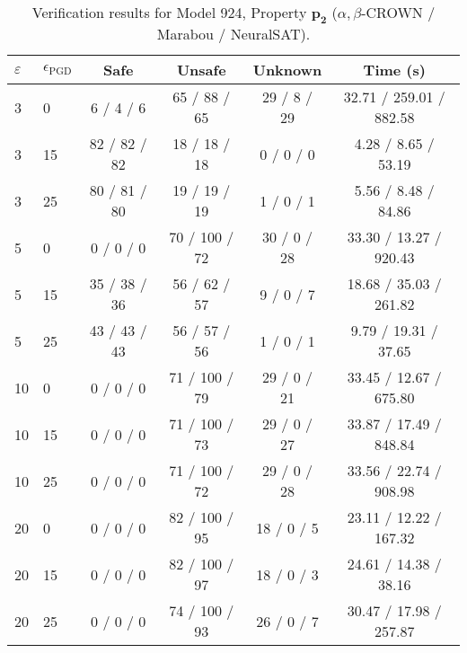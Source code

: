 \begin{table}[htbp]\centering
\caption{\small Verification results for Model 924, Property $\mathbf{p_{2}}$ ($\alpha,\beta$-CROWN / Marabou / NeuralSAT).}
\label{tab:model924_p2}
\begin{tabular}{llcccc}
\toprule
$\varepsilon$ & $\epsilon_{\scriptscriptstyle\mathrm{PGD}}$ & Safe & Unsafe & Unknown & Time (s) \\
\midrule
3 & 0 & 6 / 4 / 6 & 65 / 88 / 65 & 29 / 8 / 29 & 32.71 / 259.01 / 882.58 \\
3 & 15 & 82 / 82 / 82 & 18 / 18 / 18 & 0 / 0 / 0 & 4.28 / 8.65 / 53.19 \\
3 & 25 & 80 / 81 / 80 & 19 / 19 / 19 & 1 / 0 / 1 & 5.56 / 8.48 / 84.86 \\
5 & 0 & 0 / 0 / 0 & 70 / 100 / 72 & 30 / 0 / 28 & 33.30 / 13.27 / 920.43 \\
5 & 15 & 35 / 38 / 36 & 56 / 62 / 57 & 9 / 0 / 7 & 18.68 / 35.03 / 261.82 \\
5 & 25 & 43 / 43 / 43 & 56 / 57 / 56 & 1 / 0 / 1 & 9.79 / 19.31 / 37.65 \\
10 & 0 & 0 / 0 / 0 & 71 / 100 / 79 & 29 / 0 / 21 & 33.45 / 12.67 / 675.80 \\
10 & 15 & 0 / 0 / 0 & 71 / 100 / 73 & 29 / 0 / 27 & 33.87 / 17.49 / 848.84 \\
10 & 25 & 0 / 0 / 0 & 71 / 100 / 72 & 29 / 0 / 28 & 33.56 / 22.74 / 908.98 \\
20 & 0 & 0 / 0 / 0 & 82 / 100 / 95 & 18 / 0 / 5 & 23.11 / 12.22 / 167.32 \\
20 & 15 & 0 / 0 / 0 & 82 / 100 / 97 & 18 / 0 / 3 & 24.61 / 14.38 / 38.16 \\
20 & 25 & 0 / 0 / 0 & 74 / 100 / 93 & 26 / 0 / 7 & 30.47 / 17.98 / 257.87 \\
\bottomrule
\end{tabular}
\end{table}
